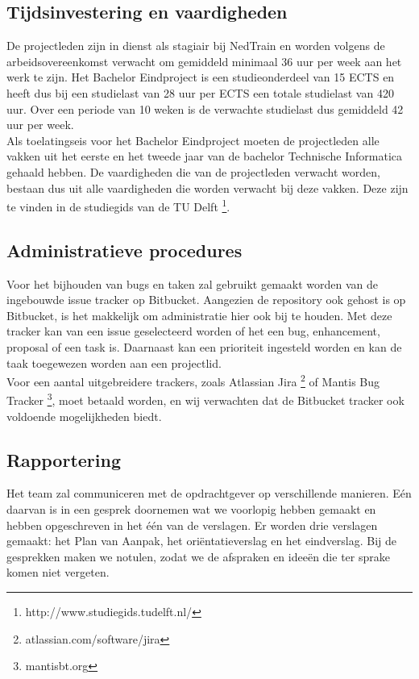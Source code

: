 \subsection{Tijdsinvestering en vaardigheden}
De projectleden zijn in dienst als stagiair bij NedTrain en worden volgens de arbeidsovereenkomst verwacht om gemiddeld minimaal 36 uur per week aan het werk te zijn. Het Bachelor Eindproject is een studieonderdeel van 15 ECTS en heeft dus bij een studielast van 28 uur per ECTS een totale studielast van 420 uur. Over een periode van 10 weken is de verwachte studielast dus gemiddeld 42 uur per week.\\

Als toelatingseis voor het Bachelor Eindproject moeten de projectleden alle vakken uit het eerste en het tweede jaar van de bachelor Technische Informatica gehaald hebben. De vaardigheden die van de projectleden verwacht worden, bestaan dus uit alle vaardigheden die worden verwacht bij deze vakken. Deze zijn te vinden in de studiegids van de TU Delft \footnote{http://www.studiegids.tudelft.nl/}.

\subsection{Administratieve procedures}
Voor het bijhouden van bugs en taken zal gebruikt gemaakt worden van de ingebouwde issue tracker op Bitbucket. Aangezien de repository ook gehost is op Bitbucket, is het makkelijk om administratie hier ook bij te houden. Met deze tracker kan van een issue geselecteerd worden of het een bug, enhancement, proposal of een task is. Daarnaast kan een prioriteit ingesteld worden en kan de taak toegewezen worden aan een projectlid.\\

Voor een aantal uitgebreidere trackers, zoals Atlassian Jira \footnote{atlassian.com/software/jira} of Mantis Bug Tracker \footnote{mantisbt.org}, moet betaald worden, en wij verwachten dat de Bitbucket tracker ook voldoende mogelijkheden biedt.

\subsection{Rapportering}
Het team zal communiceren met de opdrachtgever op verschillende manieren. E\'en daarvan is in een gesprek doornemen wat we voorlopig hebben gemaakt en hebben opgeschreven in het \'e\'en van de verslagen. Er worden drie verslagen gemaakt: het Plan van Aanpak, het ori\"entatieverslag en het eindverslag. Bij de gesprekken maken we notulen, zodat we de afspraken en idee\"en die ter sprake komen niet vergeten.

